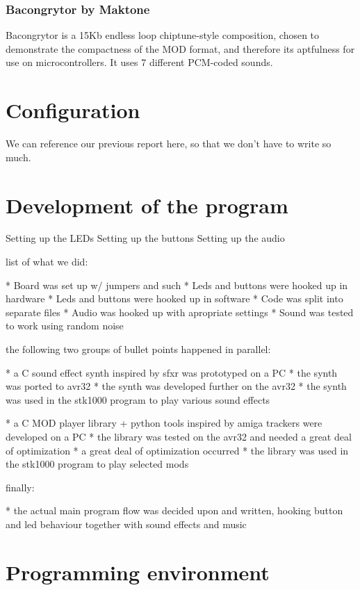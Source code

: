 \subsubsection{Bacongrytor by Maktone}
Bacongrytor is a 15Kb endless loop chiptune-style composition, chosen to demonstrate the compactness of the MOD format, and therefore its aptfulness for use on microcontrollers.
It uses 7 different PCM-coded sounds.


\section{Configuration}

We can reference our previous report here, so that we don't have to write so much.


\section{Development of the program}

Setting up the LEDs
Setting up the buttons
Setting up the audio

list of what we did:

* Board was set up w/ jumpers and such
* Leds and buttons were hooked up in hardware
* Leds and buttons were hooked up in software
* Code was split into separate files
* Audio was hooked up with apropriate settings
* Sound was tested to work using random noise


the following two groups of bullet points happened in parallel:

* a C sound effect synth inspired by sfxr was prototyped on a PC
* the synth was ported to avr32
* the synth was developed further on the avr32
* the synth was used in the stk1000 program to play various sound effects

* a C MOD player library + python tools inspired by amiga trackers were developed on a PC
* the library was tested on the avr32 and needed a great deal of optimization
* a great deal of optimization occurred 
* the library was used in the stk1000 program to play selected mods


finally:

* the actual main program flow was decided upon and written, hooking button and led behaviour together with sound effects and music





\section{Programming environment}

